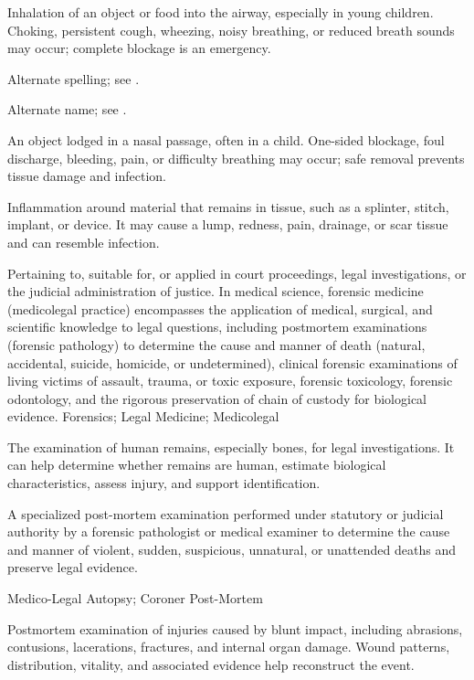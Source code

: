  Inhalation of an object or food into the airway, especially in young children. Choking, persistent cough, wheezing, noisy breathing, or reduced breath sounds may occur; complete blockage is an emergency.

 Alternate spelling; see .

 Alternate name; see .

 An object lodged in a nasal passage, often in a child. One-sided blockage, foul discharge, bleeding, pain, or difficulty breathing may occur; safe removal prevents tissue damage and infection.

 Inflammation around material that remains in tissue, such as a splinter, stitch, implant, or device. It may cause a lump, redness, pain, drainage, or scar tissue and can resemble infection.

 Pertaining to, suitable for, or applied in court proceedings, legal investigations, or the judicial administration of justice. In medical science, forensic medicine (medicolegal practice) encompasses the application of medical, surgical, and scientific knowledge to legal questions, including postmortem examinations (forensic pathology) to determine the cause and manner of death (natural, accidental, suicide, homicide, or undetermined), clinical forensic examinations of living victims of assault, trauma, or toxic exposure, forensic toxicology, forensic odontology, and the rigorous preservation of chain of custody for biological evidence.
\synonyms
Forensics; Legal Medicine; Medicolegal

 The examination of human remains, especially bones, for legal investigations. It can help determine whether remains are human, estimate biological characteristics, assess injury, and support identification.

 A specialized post-mortem examination performed under statutory or judicial authority by a forensic pathologist or medical examiner to determine the cause and manner of violent, sudden, suspicious, unnatural, or unattended deaths and preserve legal evidence.

\synonyms
Medico-Legal Autopsy; Coroner Post-Mortem

 Postmortem examination of injuries caused by blunt impact, including abrasions, contusions, lacerations, fractures, and internal organ damage. Wound patterns, distribution, vitality, and associated evidence help reconstruct the event.

